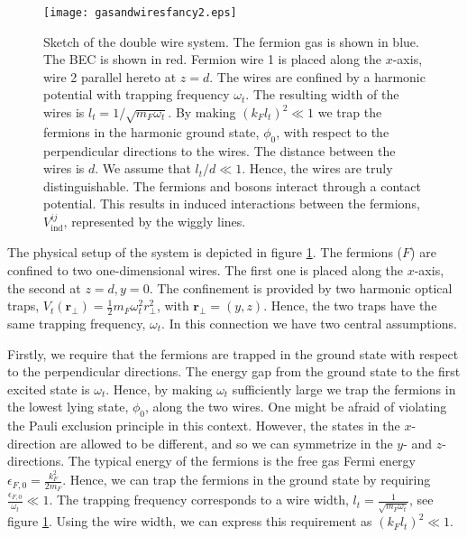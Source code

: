 \begin{figure} 
\begin{center}  
\texttt{[image: gasandwiresfancy2.eps]}  
\caption{Sketch of the double wire system. The fermion gas is shown in blue. The BEC is shown in red. Fermion wire 1 is placed along the $x$-axis, wire 2 parallel hereto at $z = d$. The wires are confined by a harmonic potential with trapping frequency $\omega_t$. The resulting width of the wires is $l_t = 1/\sqrt{m_F\omega_t}$. By making $(k_Fl_t)^2 \ll 1$ we trap the fermions in the harmonic ground state, $\phi_0$, with respect to the perpendicular directions to the wires. The distance between the wires is $d$. We assume that $l_t / d \ll 1$. Hence, the wires are truly distinguishable. The fermions and bosons interact through a contact potential. This results in induced interactions between the fermions, $V^{ij}_{\text{ind}}$, represented by the wiggly lines.}  
\label{fig.gasandwires}  
\end{center}    
\end{figure}

The physical setup of the system is depicted in figure \ref{fig.gasandwires}. The fermions ($F$) are confined to two one-dimensional wires. The first one is placed along the $x$-axis, the second at $z = d, y = 0$. The confinement is provided by two harmonic optical traps, $V_t(\mathbf{r}_{\perp}) = \frac{1}{2}m_F\omega_t^2r_{\perp}^2$, with $\mathbf{r}_{\perp} = (y, z)$. Hence, the two traps have the same trapping frequency, $\omega_t$. In this connection we have two central assumptions. 

Firstly, we require that the fermions are trapped in the ground state with respect to the perpendicular directions. The energy gap from the ground state to the first excited state is $\omega_t$. Hence, by making $\omega_t$ sufficiently large we trap the fermions in the lowest lying state, $\phi_0$, along the two wires. One might be afraid of violating the Pauli exclusion principle in this context. However, the states in the $x$-direction are allowed to be different, and so we can symmetrize in the $y$- and $z$-directions. The typical energy of the fermions is the free gas Fermi energy $\epsilon_{F,0} = \frac{k_F^2}{2m_F}$. Hence, we can trap the fermions in the ground state by requiring $\frac{\epsilon_{F,0}}{\omega_t} \ll 1$. The trapping frequency corresponds to a wire width, $l_t = \frac{1}{\sqrt{m_F\omega_t}}$, see figure \ref{fig.gasandwires}. Using the wire width, we can express this requirement as $(k_Fl_t)^2 \ll 1$. 

